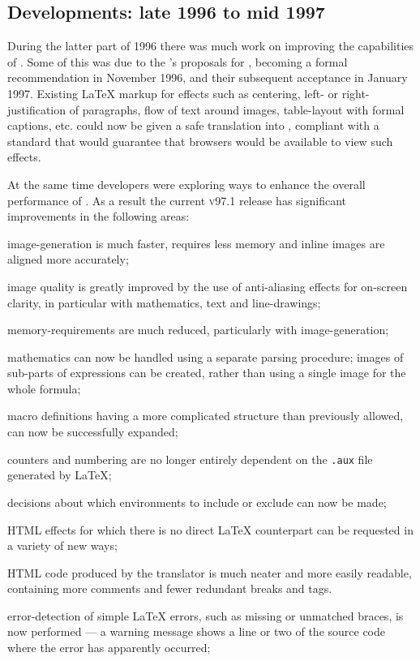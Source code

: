 \subsection*{Developments: late 1996 to mid 1997\label{recent97}}%
%
During the latter part of 1996 there was much work on improving the
capabilities of \latextohtml.
Some of this was due to the \WiiiC's proposals for \HTMLiii, 
becoming a formal recommendation in November 1996,
and their subsequent acceptance in January 1997. 
Existing \LaTeX{} markup for effects such as centering, left- 
or right-justification of paragraphs,
flow of text around images, table-layout with formal captions, etc.
could now be given a safe translation into \HTMLiii, compliant with a standard
that would guarantee that browsers would be available to view such effects.  

At the same time developers were exploring ways to enhance the overall
performance of \latextohtml.
As a result the current \textsc{v97.1} release has significant improvements in
the following areas:
%
\begin{htmllist}
% 
\item[image-generation]
is much faster, requires less memory
and inline images are aligned more accurately; 
%
\item[image quality]
is greatly improved by the use of anti-aliasing effects for on-screen clarity,
in particular with mathematics, text and line-drawings; 
%
\item[memory-requirements]
are much reduced, particularly with image-generation;
%
\item[mathematics]
can now be handled using a separate parsing procedure;
images of sub-parts of expressions can be created, rather
than using a single image for the whole formula;
%
\item[macro definitions]
having a more complicated structure than previously allowed,
can now be successfully expanded;
%
\item[counters]
and numbering are no longer entirely dependent on the \texttt{.aux}
file generated by \LaTeX;
%
\item[decisions]
about which environments to include or exclude can now be made;
%
\item[HTML effects]
for which there is no direct \LaTeX{} counterpart
can be requested in a variety of new ways;
%
\item[HTML code]
produced by the translator is much neater and more easily readable,
containing more comments and fewer redundant breaks and  tags.
%
\item[error-detection]
of simple \LaTeX{} errors, such as missing or unmatched braces, 
is now performed --- a warning message shows a line or two
of the source code where the error has apparently occurred;
%
\end{htmllist} 


